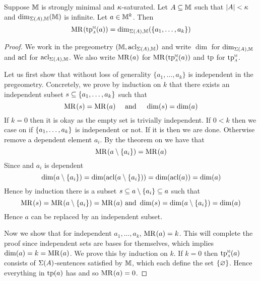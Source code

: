 \begin{prop}
    Suppose $\mathbb{M}$ is strongly minimal and $\kappa$-saturated.
    Let $A \subseteq \mathbb{M}$ such that $\left\vert A \right\vert < \kappa$ and $\dim_{\Sigma(A),\mathbb{M}}(\mathbb{M})$ is 
    infinite.
    Let $a \in \mathbb{M}^k$. Then 
    \[\MR{}{\subintp{A}{\M}{\tp}(a)} = \dim_{\Si(A),\M}(\{a_1,\dots,a_k\})\]
\end{prop}
\begin{proof}
    We work in the pregeometry $(\mathbb{M},\operatorname{acl}_{\Sigma(A),\mathbb{M}})$ and write 
    $\dim$ for $\dim_{\Sigma(A),\mathbb{M}}$ and $\operatorname{acl}$ for $\operatorname{acl}_{\Sigma(A),\mathbb{M}}$.
    We also write $\mathrm{MR}^{}(a)$ for $\MR{}{\subintp{A}{\M}{\tp}(a)}$ and
    $\operatorname{tp}$ for $\subintp{A}{\M}{\tp}$.

    Let us first show that without loss of generality 
    $\{a_1,\dots,a_k\}$ is independent in the pregeometry.
    Concretely, we prove by induction on $k$ that there exists an independent
    subset $s \subseteq \left\{a_1,\dots,a_k\right\}$ such that 
    \[\mathrm{MR}^{}(s) = \mathrm{MR}^{}(a) \quad \text{ and } \quad \dim(s) = \dim(a)\]
    If $k = 0$ then it is okay as the empty set is trivially independent.
    If $0 < k$ then we case on if $\left\{a_1,\dots,a_k\right\}$ is independent
    or not.
    If it is then we are done. 
    Otherwise remove a dependent element $a_i$.
    By the theorem on  we have that 
    \[\mathrm{MR}^{}(a \setminus \left\{a_i\right\}) = \mathrm{MR}^{}(a)\]
    Since 
    and $a_i$ is dependent
    \[
        \dim(a \setminus \left\{a_i\right\}) = \dim(\operatorname{acl}(a \setminus \left\{a_i\right\}))
        = \dim(\operatorname{acl}(a)) = \dim(a)
    \]
    Hence by induction there is a subset $s \subseteq a \setminus \left\{a_i\right\} \subseteq a$
    such that 
    \[\mathrm{MR}^{}(s) = \mathrm{MR}^{}(a \setminus \left\{a_i\right\}) = \mathrm{MR}^{}(a)
    \text{ and } \dim(s) = \dim(a \setminus \left\{a_i\right\}) = \dim(a)\]
    Hence $a$ can be replaced by an independent subset.

    Now we show that for independent $a_1,\dots,a_k$, $\mathrm{MR}^{}(a) = k$.
    This will complete the proof since independent sets 
    are bases for themselves, which implies $\dim(a) = k = \mathrm{MR}^{}(a)$.
    We prove this by induction on $k$.
    If $k = 0$ then $\subintp{A}{\M}{\tp}(a)$ 
    consists of $\Sigma(A)$-sentences satisfied by $\mathbb{M}$, 
    which  each define the set 
    $\left\{\varnothing\right\}$. 
    Hence everything in $\operatorname{tp}(a)$ has 
    and so $\mathrm{MR}^{}(a) = 0$.


\end{proof}
